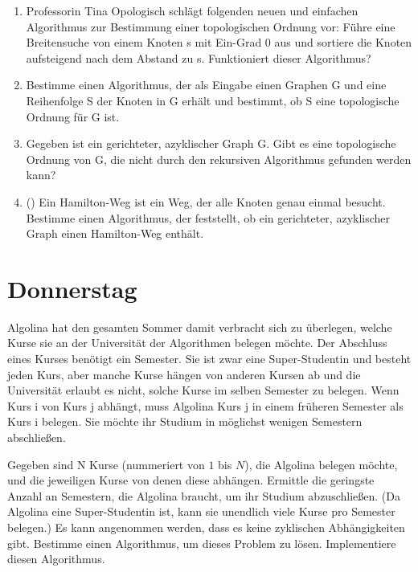 \documentclass{uebung_cs}
\begin{document}
\begin{aufgabe}\mbox{}
	\begin{enumerate}
		\item Professorin Tina Opologisch schlägt folgenden neuen und einfachen Algorithmus zur Bestimmung einer topologischen Ordnung vor: Führe eine Breitensuche von einem Knoten s mit Ein-Grad $0$ aus und sortiere die Knoten aufsteigend nach dem Abstand zu s. Funktioniert dieser Algorithmus?
		\item Bestimme einen Algorithmus, der als Eingabe einen Graphen G und eine Reihenfolge S der Knoten in G erhält und bestimmt, ob S eine topologische Ordnung für G ist.
		\item Gegeben ist ein gerichteter, azyklischer Graph G.
		Gibt es eine topologische Ordnung von G, die nicht durch den rekursiven Algorithmus gefunden werden kann?
		\item (\hard) Ein Hamilton-Weg ist ein Weg, der alle Knoten genau einmal besucht.
		Bestimme einen Algorithmus, der feststellt, ob ein gerichteter, azyklischer Graph einen Hamilton-Weg enthält.
	\end{enumerate}
\end{aufgabe}

\section*{Donnerstag}
\begin{aufgabe}[Studiengangplanung]
Algolina hat den gesamten Sommer damit verbracht sich zu überlegen, welche Kurse sie an der Universität der Algorithmen belegen möchte.
Der Abschluss eines Kurses benötigt ein Semester. Sie ist zwar eine Super-Studentin und besteht jeden Kurs, aber manche Kurse hängen von anderen Kursen ab und die Universität erlaubt es nicht, solche Kurse im selben Semester zu belegen. Wenn Kurs i von Kurs j abhängt, muss Algolina Kurs j in einem früheren Semester als Kurs i belegen.
Sie möchte ihr Studium in möglichst wenigen Semestern abschließen.

Gegeben sind N Kurse (nummeriert von $1$ bis $N$), die Algolina belegen möchte, und die jeweiligen Kurse von denen diese abhängen.
Ermittle die geringste Anzahl an Semestern, die Algolina braucht, um ihr Studium abzuschließen.
(Da Algolina eine Super-Studentin ist, kann sie unendlich viele Kurse pro Semester belegen.)
Es kann angenommen werden, dass es keine zyklischen Abhängigkeiten gibt.
Bestimme einen Algorithmus, um dieses Problem zu lösen. Implementiere diesen Algorithmus.
\end{aufgabe}
\end{document}
